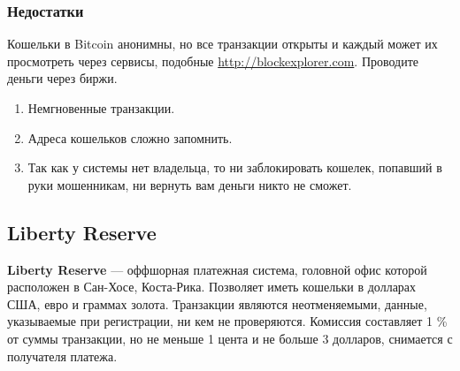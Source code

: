 \begin{enumerate}
\subsubsection{Недостатки}
\begin{important}
Кошельки в Bitcoin анонимны, но все транзакции открыты и каждый может их просмотреть через сервисы, подобные \url{http://blockexplorer.com}. Проводите деньги через биржи.
\end{important}
\begin{enumerate}
\item Немгновенные транзакции.
\item Адреса кошельков сложно запомнить.
\item Так как у системы нет владельца, то ни заблокировать кошелек, попавший в руки мошенникам, ни вернуть вам деньги никто не сможет.
\end{enumerate}
\subsection{Liberty Reserve}
\textbf{Liberty Reserve} --- оффшорная платежная система, головной офис которой расположен в Сан-Хосе, Коста-Рика. Позволяет иметь кошельки в долларах США, евро и граммах золота. Транзакции являются неотменяемыми, данные, указываемые при регистрации, ни кем не проверяются. Комиссия составляет 1 \% от суммы транзакции, но не меньше 1 цента и не больше 3 долларов, снимается с получателя платежа.

\end{enumerate}
